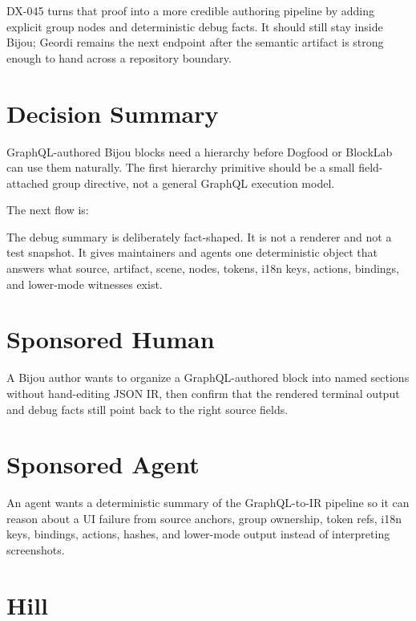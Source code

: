 DX-045 turns that proof into a more credible authoring pipeline by adding explicit group nodes and deterministic debug facts. It should still stay inside Bijou; Geordi remains the next endpoint after the semantic artifact is strong enough to hand across a repository boundary.

\section{Decision Summary}\label{record-141-decision-summary}

GraphQL-authored Bijou blocks need a hierarchy before Dogfood or BlockLab can use them naturally. The first hierarchy primitive should be a small field-attached group directive, not a general GraphQL execution model.

The next flow is:



The debug summary is deliberately fact-shaped. It is not a renderer and not a test snapshot. It gives maintainers and agents one deterministic object that answers what source, artifact, scene, nodes, tokens, i18n keys, actions, bindings, and lower-mode witnesses exist.

\section{Sponsored Human}\label{record-141-sponsored-human}

A Bijou author wants to organize a GraphQL-authored block into named sections without hand-editing JSON IR, then confirm that the rendered terminal output and debug facts still point back to the right source fields.

\section{Sponsored Agent}\label{record-141-sponsored-agent}

An agent wants a deterministic summary of the GraphQL-to-IR pipeline so it can reason about a UI failure from source anchors, group ownership, token refs, i18n keys, bindings, actions, hashes, and lower-mode output instead of interpreting screenshots.

\section{Hill}\label{record-141-hill}


